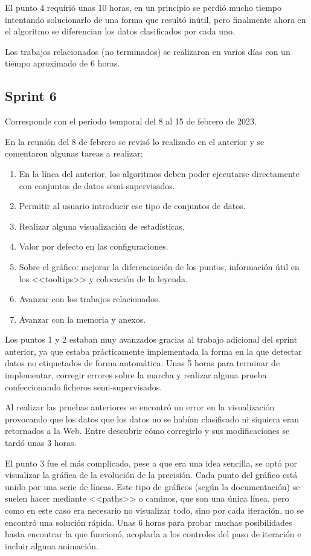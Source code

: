 El punto 4 requirió unas 10 horas, en un principio se perdió mucho tiempo
intentando solucionarlo de una forma que resultó inútil, pero finalmente ahora
en el algoritmo se diferencian los datos clasificados por cada uno.

Los trabajos relacionados (no terminados) se realizaron en varios días con un
tiempo aproximado de 6 horas.

\subsection{Sprint 6}
Corresponde con el periodo temporal del 8 al 15 de febrero de 2023.

En la reunión del 8 de febrero se revisó lo realizado en el anterior y se
comentaron algunas tareas a realizar:
\begin{enumerate}
    \item En la línea del anterior, los algoritmos deben poder ejecutarse
    directamente con conjuntos de datos semi-supervisados.
    \item Permitir al usuario introducir ese tipo de conjuntos de datos.
    \item Realizar alguna visualización de estadísticas.
    \item Valor por defecto en las configuraciones.
    \item Sobre el gráfico: mejorar la diferenciación de los puntos, información
    útil en los <<tooltips>> y colocación de la leyenda.
    \item Avanzar con los trabajos relacionados.
    \item Avanzar con la memoria y anexos.
\end{enumerate}

Los puntos 1 y 2 estaban muy avanzados gracias al trabajo adicional del sprint
anterior, ya que estaba prácticamente implementada la forma en la que detectar
datos no etiquetados de forma automática. Unas 5 horas para terminar de
implementar, corregir errores sobre la marcha y realizar alguna prueba
confeccionando ficheros semi-supervisados.

Al realizar las pruebas anteriores se encontró un error en la visualización
provocando que los datos que los datos no se habían clasificado ni siquiera eran
retornados a la Web. Entre descubrir cómo corregirlo y sus modificaciones se
tardó unas 3 horas.

El punto 3 fue el más complicado, pese a que era una idea sencilla, se optó por
visualizar la gráfica de la evolución de la precisión. Cada punto del gráfico
está unido por una serie de líneas. Este tipo de gráficos (según la
documentación) se suelen hacer mediante <<paths>> o caminos, que son una única
línea, pero como en este caso era necesario no visualizar todo, sino por cada
iteración, no se encontró una solución rápida. Unas 6 horas para probar muchas
posibilidades hasta encontrar la que funcionó, acoplarla a los controles del
paso de iteración e incluir alguna animación.

